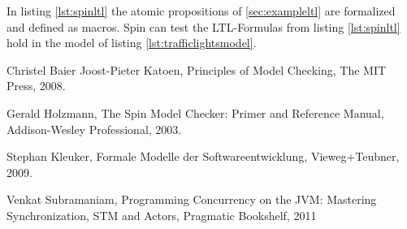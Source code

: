 \documentclass[12pt,a4paper,twoside]{article}
\begin{document}
In listing \ref{lst:spinltl} the atomic propositions of \ref{sec:exampleltl} are formalized and defined as macros. Spin can test the LTL-Formulas from listing \ref{lst:spinltl} hold in the model of listing \ref{lst:trafficlightsmodel}.

\begin{thebibliography}{9}
Christel Baier Joost-Pieter Katoen,
Principles of Model Checking,
The MIT Press,
2008.

Gerald Holzmann,
The Spin Model Checker: Primer and Reference Manual,
Addison-Wesley Professional,
2003.

Stephan Kleuker,
Formale Modelle der Softwareent\-wicklung,
View\-eg+\-Teub\-ner,
2009.

Venkat Subramaniam,
Programming Concurrency on the JVM: Mastering Synchronization, STM and Actors,
Pragmatic Bookshelf,
2011

\end{thebibliography}
\end{document}
